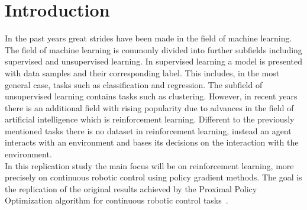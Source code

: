 \chapter{Introduction}\label{ch:introduction}
In the past years great strides have been made in the field of machine learning.
The field of machine learning is commonly divided into further subfields including supervised and unsupervised learning.
In supervised learning a model is presented with data samples and their corresponding label.
This includes, in the most general case, tasks such as classification and regression.
The subfield of unsupervised learning contains tasks such as clustering.
However, in recent years there is an additional field with rising popularity due to advances in the field of artificial intelligence
which is reinforcement learning.
Different to the previously mentioned tasks there is no dataset in reinforcement learning, instead an agent interacts
with an environment and bases its decisions on the interaction with the environment.\\
In this replication study the main focus will be on reinforcement learning, more precisely on continuous robotic control
using policy gradient methods.
The goal is the replication of the original results achieved by the Proximal Policy Optimization algorithm for continuous
robotic control tasks~\cite{schulman2017ppo}.
